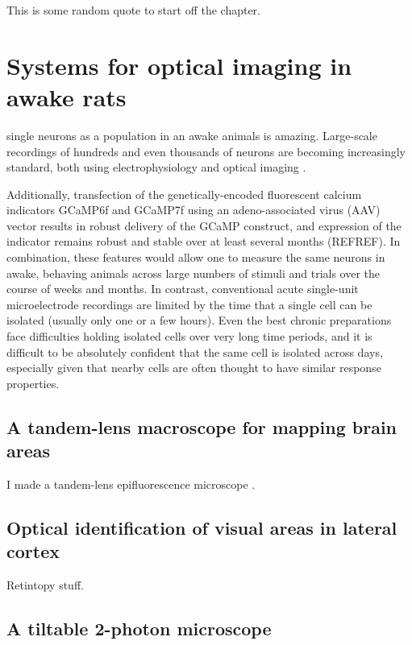 \begin{savequote}[75mm]
This is some random quote to start off the chapter.
\end{savequote}

\chapter{Systems for optical imaging in awake rats}

 single neurons as a population in an awake animals is amazing. Large-scale recordings of hundreds and even thousands of neurons are becoming increasingly standard, both using electrophysiology \cite{NEUROPIXELS ETC} and optical imaging \cite{STRINGER}. 

Additionally, transfection of the genetically-encoded fluorescent calcium indicators GCaMP6f and GCaMP7f using an adeno-associated virus (AAV) vector results in robust delivery of the GCaMP construct, and expression of the indicator remains robust and stable over at least several months (REFREF). In combination, these features would allow one to measure the same neurons in awake, behaving animals across large numbers of stimuli and trials over the course of weeks and months. In contrast, conventional acute single-unit microelectrode recordings are limited by the time that a single cell can be isolated (usually only one or a few hours). Even the best chronic preparations face difficulties holding isolated cells over very long time periods, and it is difficult to be absolutely confident that the same cell is isolated across days, especially given that nearby cells are often thought to have similar response properties.

\section{A tandem-lens macroscope for mapping brain areas}
I made a tandem-lens epifluorescence microscope \cite{Ratzlaff1991}.

\section{Optical identification of visual areas in lateral cortex}
Retintopy stuff.

\section{A tiltable 2-photon microscope}

